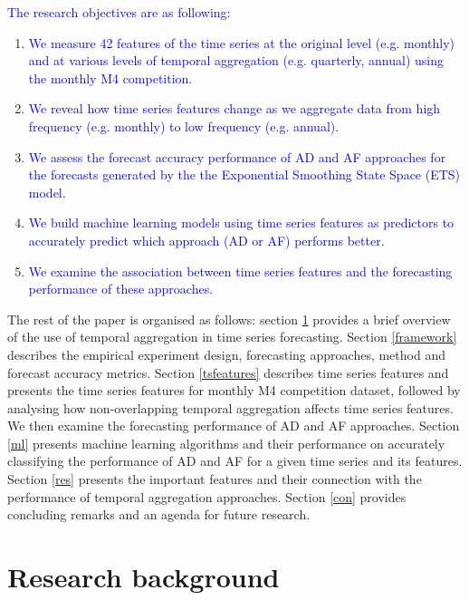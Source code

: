 \documentclass[preprint, 3p,
authoryear]{elsarticle} %
\begin{document}
\textcolor{blue}{The research objectives are as following:}

\begin{enumerate}
\def\labelenumi{\arabic{enumi}.}
\item
  \textcolor{blue}{We measure 42 features of the time series at the original level (e.g. monthly) and at various levels of temporal aggregation (e.g. quarterly, annual) using the monthly M4 competition.}
\item
  \textcolor{blue}{We reveal how time series features change as we aggregate data from high frequency (e.g. monthly) to low frequency (e.g. annual).}
\item
  \textcolor{blue}{We assess the forecast accuracy performance of AD and AF approaches for the forecasts generated by the the Exponential Smoothing State Space (ETS) model.}
\item
  \textcolor{blue}{We build machine learning models using time series features as predictors to accurately predict which approach (AD or AF) performs better.}
\item
  \textcolor{blue}{We examine the association between time series features and the forecasting performance of these approaches.}
\end{enumerate}

The rest of the paper is organised as follows: section \ref{lit}
provides a brief overview of the use of temporal aggregation in time
series forecasting. Section \ref{framework} describes the empirical
experiment design, forecasting approaches, method and forecast accuracy
metrics. Section \ref{tsfeatures} describes time series features and
presents the time series features for monthly M4 competition dataset,
followed by analysing how non-overlapping temporal aggregation affects
time series features. We then examine the forecasting performance of AD
and AF approaches. Section \ref{ml} presents machine learning algorithms
and their performance on accurately classifying the performance of AD
and AF for a given time series and its features. Section \ref{res}
presents the important features and their connection with the
performance of temporal aggregation approaches. Section \ref{con}
provides concluding remarks and an agenda for future research.

\hypertarget{lit}{%
\section{Research background}\label{lit}}
\end{document}
